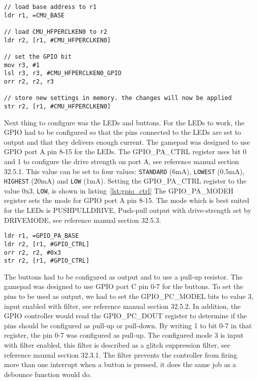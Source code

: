 \begin{lstlisting}[label=lst:cmu, caption=Enabling the GPIO clock.]
// load base address to r1
ldr r1, =CMU_BASE

// load CMU_HFPERCLKEN0 to r2
ldr r2, [r1, #CMU_HFPERCLKEN0]

// set the GPIO bit
mov r3, #1
lsl r3, r3, #CMU_HFPERCLKEN0_GPIO
orr r2, r2, r3

// store new settings in memory. the changes will now be applied
str r2, [r1, #CMU_HFPERCLKEN0]
\end{lstlisting}

Next thing to configure was the LEDs and buttons. For the LEDs to work, the GPIO had to be configured so that the pins connected to the LEDs are set to output and that they delivers enough current. The gamepad was designed to use GPIO port A pin 8-15 for the LEDs. The GPIO\_PA\_CTRL register uses bit 0 and 1 to configure the drive strength on port A, see reference manual\cite{efm32ggrm} section 32.5.1. This value can be set to four values: \texttt{STANDARD} (6mA), \texttt{LOWEST} (0.5mA), \texttt{HIGHEST} (20mA) and \texttt{LOW} (1mA). Setting the GPIO\_PA\_CTRL register to the value 0x3, \texttt{LOW}, is shown in listing~\ref{lst:gpio_ctrl} The GPIO\_PA\_MODEH register sets the mode for GPIO port A pin 8-15. The mode which is best suited for the LEDs is PUSHPULLDRIVE, Push-pull output with drive-strength set by DRIVEMODE, see reference manual\cite{efm32ggrm} section 32.5.3.

\begin{lstlisting}[label=lst:gpio_ctrl, caption=Setting GPIO port A alternate drive strength.]
ldr r1, =GPIO_PA_BASE
ldr r2, [r1, #GPIO_CTRL]
orr r2, r2, #0x3
str r2, [r1, #GPIO_CTRL]
\end{lstlisting}

The buttons had to be configured as output and to use a pull-up resistor. The gamepad was designed to use GPIO port C pin 0-7 for the buttons. To set the pins to be used as output, we had to set the GPIO\_PC\_MODEL bits to value 3, input enabled with filter, see reference manual\cite{efm32ggrm} section 32.5.2. In addition, the GPIO controller would read the GPIO\_PC\_DOUT register to determine if the pins should be configured as pull-up or pull-down. By writing 1 to bit 0-7 in that register, the pin 0-7 was configured as pull-up. The configured mode 3 is input with filter enabled, this filter is described as a glitch suppression filter, see reference manual\cite{efm32ggrm} section 32.3.1. The filter prevents the controller from firing more than one interrupt when a button is pressed, it does the same job as a debounce function would do.

